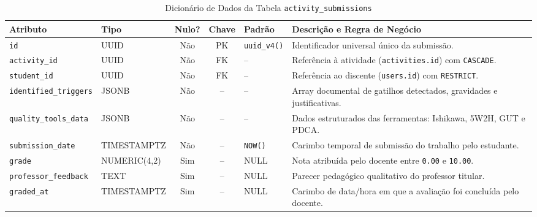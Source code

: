 \begin{table}[!ht]
\centering
\caption{Dicionário de Dados da Tabela \texttt{activity\_submissions}}
\label{tab_dic_activity_submissions}
\footnotesize
\begin{tabularx}{\textwidth}{p{3.2cm} p{2.5cm} c c p{1.8cm} X}
\toprule
\textbf{Atributo} & \textbf{Tipo} & \textbf{Nulo?} & \textbf{Chave} & \textbf{Padrão} & \textbf{Descrição e Regra de Negócio} \\
\midrule
\texttt{id} & UUID & Não & PK & \texttt{uuid\_v4()} & Identificador universal único da submissão. \\
\texttt{activity\_id} & UUID & Não & FK & -- & Referência à atividade (\texttt{activities.id}) com \texttt{CASCADE}. \\
\texttt{student\_id} & UUID & Não & FK & -- & Referência ao discente (\texttt{users.id}) com \texttt{RESTRICT}. \\
\texttt{identified\_\-triggers} & JSONB & Não & -- & -- & Array documental de gatilhos detectados, gravidades e justificativas. \\
\texttt{quality\_\-tools\_\-data} & JSONB & Não & -- & -- & Dados estruturados das ferramentas: Ishikawa, 5W2H, GUT e PDCA. \\
\texttt{submission\_date} & TIMESTAMPTZ & Não & -- & \texttt{NOW()} & Carimbo temporal de submissão do trabalho pelo estudante. \\
\texttt{grade} & NUMERIC(4,2) & Sim & -- & NULL & Nota atribuída pelo docente entre \texttt{0.00} e \texttt{10.00}. \\
\texttt{professor\_\-feedback} & TEXT & Sim & -- & NULL & Parecer pedagógico qualitativo do professor titular. \\
\texttt{graded\_at} & TIMESTAMPTZ & Sim & -- & NULL & Carimbo de data/hora em que a avaliação foi concluída pelo docente. \\
\bottomrule
\end{tabularx}
\end{table}
